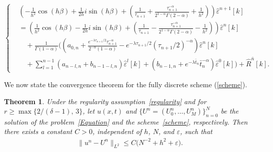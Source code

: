 \documentclass[10pt, reqno]{amsart}
\newtheorem{thm}{\bf Theorem}
\newenvironment{theorem}{\begin{thm}} {\end{thm}}
\theoremstyle{remark}
\theoremstyle{definition}
\numberwithin{table}{section}
\begin{document}
\begin{equation}\label{conLemma}
\left\{
\begin{aligned}
    &(-\frac{1}{h^2}\cos(h\beta)+\frac{1}{2h}i\sin(h\beta)+(\frac{1}{\tau_{n+1}}+\frac{\tau_{n+1}^{-\alpha}}{2^{1-\alpha}\Gamma(2-\alpha)}+\frac{1}{h^2}) )\hat{\varepsilon}^{n+1}[k] \\
    &=(\frac{1}{h^2}\cos(h\beta)-\frac{1}{2h}i\sin(h\beta)+(\frac{1}{\tau_{n+1}}-\frac{\tau_{n+1}^{-\alpha}}{2^{1-\alpha}\Gamma(2-\alpha)}-\frac{1}{h^2}) )\hat{\varepsilon}^{n}[k] \\
    &\quad +\frac{1}{\Gamma(1-\alpha)}((a_{0, n} +\frac{e^{-\lambda {\tau_{n+1}}/{2}}\tau_{n+1}^{-\alpha}}{2^{-\alpha}(1-\alpha)}-e^{-\lambda {\tau_{n+1}}/{2}} ({\tau_{n+1}}/{2})^{-\alpha})\hat{\varepsilon}^{n}[k]\\
    &\quad +\sum\limits_{l=1}^{n-1} (a_{n-l, n}+b_{n-1-l, n}) \hat{\varepsilon}^{l}[k]+(b_{n-1, n}+{e^{-\lambda \bar{t}_n}}{\bar{t}_n^{-\alpha}}) \hat{\varepsilon}^{0}[k])+\hat{R}^{\bar{n}}[k].
\end{aligned}
\right.
\end{equation}

 We now state the convergence theorem for the fully discrete scheme (\ref{scheme}).
\begin{theorem}\label{converge}
Under the regularity assumption~\eqref{regularity} and for
$r \ge \max\{ 2/(\delta-1),\, 3 \}$,
let $u(x,t)$ and $\{U^n = (U_0^n, \ldots, U_M^n)\}_{n=0}^N$
 be the solution of the problem~\eqref{Equation} and the scheme~\eqref{scheme}, respectively.
Then there exists a constant $C>0$, independent of $h$, $N$, and $\varepsilon$, such that
\begin{align}
\|u^n - U^n\|_{L^2} \le C \big( N^{-2} + h^2 + \varepsilon \big).
\label{2-order}
\end{align}
\end{theorem}
\end{document}
